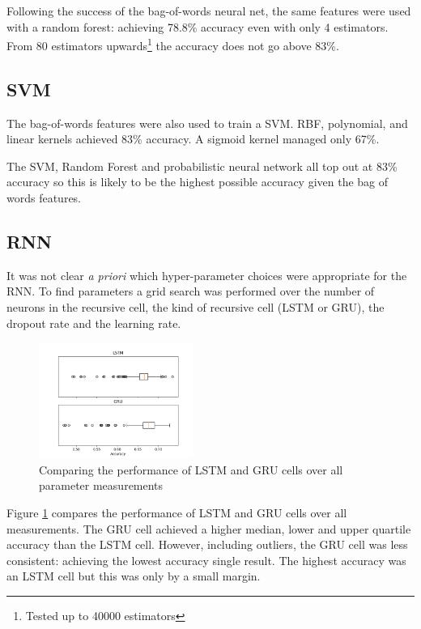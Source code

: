   Following the success of the bag-of-words neural net, the same features were
  used with a random forest: achieving 78.8\% accuracy even with only 4
  estimators. From 80 estimators upwards\footnote{Tested up to 40000 estimators}
  the accuracy does not go above 83\%.

  \subsection{SVM}
  \label{sec:svm_extension}

  The bag-of-words features were also used to train a SVM. RBF, polynomial, and
  linear kernels achieved 83\% accuracy. A sigmoid kernel managed only 67\%.

  The SVM, Random Forest and probabilistic neural network all top out at 83\%
  accuracy so this is likely to be the highest possible accuracy given the bag
  of words features. 

  \subsection{RNN}
  \label{sec:rnn_grid_search}

    It was not clear \textit{a priori} which hyper-parameter choices were
    appropriate for the RNN. To find parameters a grid search was performed over
    the number of neurons in the recursive cell, the kind of recursive cell
    (LSTM or GRU), the dropout rate and the learning rate.

    \begin{figure}[ht]
      \includegraphics[width=0.45\textwidth]{Figures/lstm_gru_plot.png}
      \caption{Comparing the performance of LSTM and GRU cells over all
        parameter measurements}
      \label{fig:lstm_gru}
    \end{figure}

    Figure \ref{fig:lstm_gru} compares the performance of LSTM and GRU cells
    over all measurements. The GRU cell achieved a higher
    median, lower and upper quartile accuracy than the LSTM cell. However, including
    outliers, the GRU cell was less consistent: achieving the lowest accuracy
    single result. The highest accuracy was an LSTM cell but this was only by a
    small margin.

